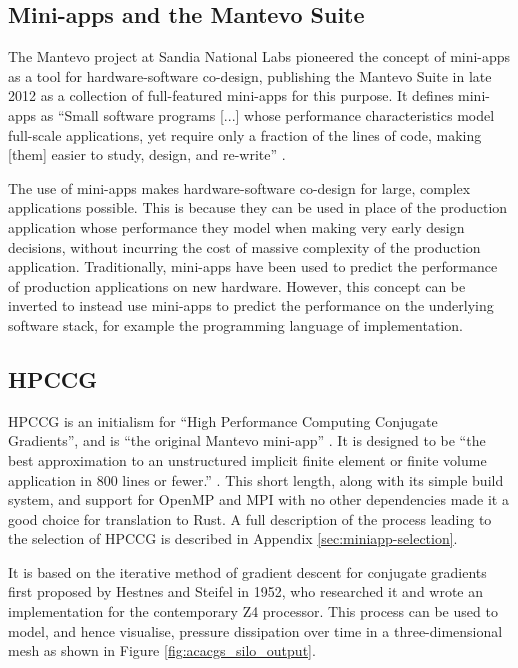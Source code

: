 \subsection{Mini-apps and the Mantevo Suite}
\label{ssec:miniapps-mantevo}

The Mantevo project at Sandia National Labs pioneered the concept of mini-apps as a tool for hardware-software co-design, publishing the Mantevo Suite in late 2012 as a collection of full-featured mini-apps for this purpose. It defines mini-apps as ``Small software programs [...] whose performance characteristics model full-scale applications, yet require only a fraction of the lines of code, making [them] easier to study, design, and re-write'' \cite{heroux2013mantevo}.

The use of mini-apps makes hardware-software co-design for large, complex applications possible. This is because they can be used in place of the production application whose performance they model when making very early design decisions, without incurring the cost of massive complexity of the production application. Traditionally, mini-apps have been used to predict the performance of production applications on new hardware. However, this concept can be inverted to instead use mini-apps to predict the performance on the underlying software stack, for example the programming language of implementation.


\subsection{HPCCG}
\label{ssec:hpccg}

HPCCG is an initialism for ``High Performance Computing Conjugate Gradients'', and is ``the original Mantevo mini-app'' \cite{herouxHPCCGSolverPackage2007}. It is designed to be ``the best approximation to an unstructured implicit finite element or finite volume application in 800 lines or fewer.'' \cite{PackagesMantevo}. This short length, along with its simple build system, and support for OpenMP and MPI with no other dependencies made it a good choice for translation to Rust. A full description of the process leading to the selection of HPCCG is described in Appendix \ref{sec:miniapp-selection}.

It is based on the iterative method of gradient descent for conjugate gradients first proposed by Hestnes and Steifel in 1952\cite{hestenesMethodsConjugateGradients1952}, who researched it and wrote an implementation for the contemporary Z4 processor. This process can be used to model, and hence visualise, pressure dissipation over time in a three-dimensional mesh as shown in Figure \ref{fig:acacgs_silo_output}.


